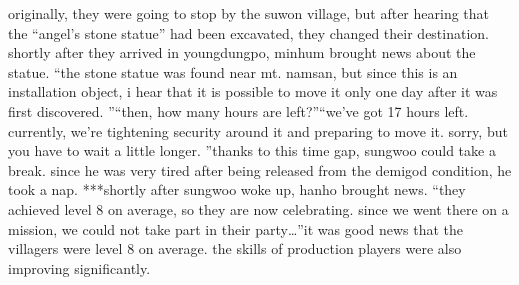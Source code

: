  originally, they were going to stop by the suwon village, but after hearing that the “angel’s stone statue” had been excavated, they changed their destination.
shortly after they arrived in youngdungpo, minhum brought news about the statue.
“the stone statue was found near mt.
 namsan, but since this is an installation object, i hear that it is possible to move it only one day after it was first discovered.
”“then, how many hours are left?”“we’ve got 17 hours left.
 currently, we’re tightening security around it and preparing to move it.
 sorry, but you have to wait a little longer.
”thanks to this time gap, sungwoo could take a break.
 since he was very tired after being released from the demigod condition, he took a nap.
***shortly after sungwoo woke up, hanho brought news.
“they achieved level 8 on average, so they are now celebrating.
 since we went there on a mission, we could not take part in their party…”it was good news that the villagers were level 8 on average.
 the skills of production players were also improving significantly.

